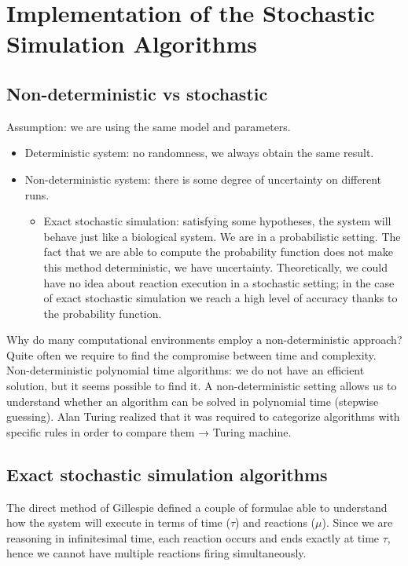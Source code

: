 \graphicspath{{chapters/03/images}}
\chapter{Implementation of the Stochastic Simulation Algorithms}

\section{Non-deterministic vs stochastic}
Assumption: we are using the same model and parameters.

\begin{itemize}
  \item Deterministic system: no randomness, we always obtain the same result.
  \item Non-deterministic system: there is some degree of uncertainty on different runs.

  \begin{itemize}
    \item Exact stochastic simulation: satisfying some hypotheses, the system will behave just like a biological system.
      We are in a probabilistic setting.
      The fact that we are able to compute the probability function does not make this method deterministic, we have uncertainty.
      Theoretically, we could have no idea about reaction execution in a stochastic setting; in the case of exact stochastic simulation we reach a high level of accuracy thanks to the probability function.
  \end{itemize}
\end{itemize}

Why do many computational environments employ a non-deterministic approach? Quite often we require to find the compromise between time and complexity.
Non-deterministic polynomial time algorithms: we do not have an efficient solution, but it seems possible to find it.
A non-deterministic setting allows us to understand whether an algorithm can be solved in polynomial time (stepwise guessing).
Alan Turing realized that it was required to categorize algorithms with specific rules in order to compare them → Turing machine.

\section{Exact stochastic simulation algorithms}
The direct method of Gillespie defined a couple of formulae able to understand how the system will execute in terms of time ($\tau$) and reactions ($\mu$).
Since we are reasoning in infinitesimal time, each reaction occurs and ends exactly at time $\tau$, hence we cannot have multiple reactions firing simultaneously.

